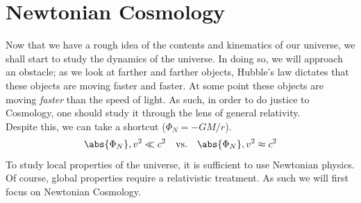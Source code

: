 \documentclass{article}
\begin{document}
\section{Newtonian Cosmology}

Now that we have a rough idea of the contents and kinematics of our universe, we shall start to study the dynamics of the universe. In doing so, we will approach an obstacle; as we look at farther and farther objects, Hubble's law dictates that these objects are moving faster and faster. At some point these objects are moving \textit{faster} than the speed of light. As such, in order to do justice to Cosmology, one should study it through the lens of general relativity.\\

Despite this, we can take a shortcut ($\Phi_N = - {GM}/{r}$).
\[ \abs{\Phi_{N}}, v^2 \ll c^2 \quad \text{vs.}\quad \abs{\Phi_{N}}, v^2 \approx c^2 \]
To study local properties of the universe, it is sufficient to use Newtonian physics. Of course, global properties require a relativistic treatment. As such we will first focus on Newtonian Cosmology.\\
\end{document}
